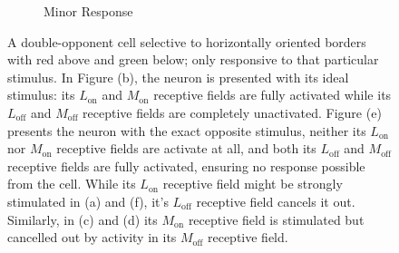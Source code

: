\documentclass{article}
\begin{document}
\begin{figure}[h]
\begin{subfigure}{0.3\textwidth}
        \caption{Minor Response}
    \end{subfigure}
    \caption{A double-opponent cell selective to horizontally oriented borders with red above and green below; only responsive to that particular stimulus. In Figure (b), the neuron is presented with its ideal stimulus: its $L_{\text{on}}$ and $M_{\text{on}}$ receptive fields are fully activated while its $L_{\text{off}}$ and $M_{\text{off}}$ receptive fields are completely unactivated. Figure (e) presents the neuron with the exact opposite stimulus, neither its $L_{\text{on}}$ nor $M_{\text{on}}$ receptive fields are activate at all, and both its $L_{\text{off}}$ and $M_{\text{off}}$ receptive fields are fully activated, ensuring no response possible from the cell. While its $L_{\text{on}}$ receptive field might be strongly stimulated in (a) and (f), it's $L_{\text{off}}$ receptive field cancels it out. Similarly, in (c) and (d) its $M_{\text{on}}$ receptive field is stimulated but cancelled out by activity in its $M_{\text{off}}$ receptive field.}
\end{figure}
\end{document}
